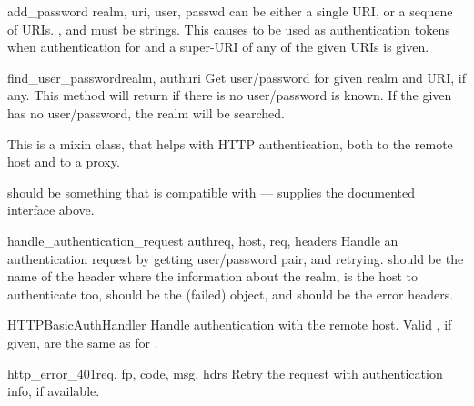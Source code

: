 \begin{methoddesc}[HTTPPasswordMgrWithDefaultRealm]{add_password}
                                                   {realm, uri, user, passwd}
 can be either a single URI, or a sequene of URIs. ,
 and  must be strings. This causes
  to be used as authentication tokens
when authentication for  and a super-URI of any of the
given URIs is given.
\end{methoddesc}  

\begin{methoddesc}[HTTPPasswordMgr]{find_user_password}{realm, authuri}
Get user/password for given realm and URI, if any. This method will
return  if there is no user/password is known.
If the given  has no user/password, the realm 
will be searched.
\end{methoddesc}

\begin{classdesc}[AbstractBasicAuthHandler]{}
This is a mixin class, that helps with HTTP authentication, both
to the remote host and to a proxy.

 should be something that is compatible with
 --- supplies the documented interface above.
\end{classdesc}

\begin{methoddesc}[AbstractBasicAuthHandler]{handle_authentication_request}
                                            {authreq, host, req, headers}
Handle an authentication request by getting user/password pair, and retrying.
 should be the name of the header where the information about
the realm,  is the host to authenticate too,  should be the 
(failed)  object, and  should be the error headers.
\end{methoddesc}

\begin{classdesc}{HTTPBasicAuthHandler}{}
Handle authentication with the remote host.
Valid , if given, are the same as for
.
\end{classdesc}

\begin{methoddesc}[HTTPBasicAuthHandler]{http_error_401}{req, fp, code, 
                                                        msg, hdrs}
Retry the request with authentication info, if available.
\end{methoddesc}

